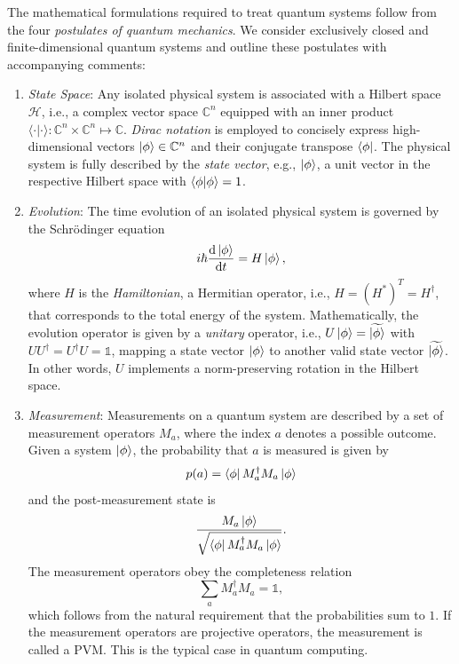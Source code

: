 \documentclass[../main.tex]{subfiles}
\begin{document}
The mathematical formulations required to treat quantum systems follow from the four \textit{postulates of quantum mechanics}. We consider exclusively closed and finite-dimensional quantum systems and outline these postulates with accompanying comments:
\begin{enumerate}[align=left]
        \item[Postulate 1] \textit{State Space}: Any isolated physical system is associated with a Hilbert space $\mathcal{H}$, i.e., a complex vector space $\mathbb{C}^n$ equipped with an inner product $\langle \cdot | \cdot \rangle : \mathbb{C}^n \times \mathbb{C}^n \mapsto \mathbb{C}$. \textit{Dirac notation} is employed to concisely express high-dimensional vectors $\ket{\phi} \in \mathbb{C}^n$ and their conjugate transpose $\bra{\phi}$. The physical system is fully described by the \textit{state vector}, e.g., $\ket{\phi}$, a unit vector in the respective Hilbert space with $\braket{\phi}{\phi} = 1$.
        
    \item[Postulate 2] \textit{Evolution}: The time evolution of an isolated physical system is           governed by the Schrödinger equation
        \begin{equation}
            i \hbar \frac{\dd \ket{\phi}}{\dd t} = H \ket{\phi},
        \end{equation} where $H$ is the \textit{Hamiltonian}, a Hermitian operator, i.e., $H = (H^{*})^T = H^\dagger$, that corresponds to the total energy of the system. Mathematically, the evolution operator is given by a \textit{unitary} operator, i.e., $U \ket{\phi} = \widetilde{\ket{\phi}}$ with $UU^\dagger = U^\dagger U = \mathds{1}$, mapping a state vector $\ket{\phi}$ to another valid state vector $\widetilde{\ket{\phi}}$. In other words, $U$ implements a norm-preserving rotation in the Hilbert space.
        
    \item[Postulate 3] \textit{Measurement}: Measurements on a quantum system are described by a set of measurement operators ${M_a }$, where the index $a$ denotes a possible outcome. Given a system $\ket{\phi}$, the probability that $a$ is measured is given by 
    \begin{equation}
        p(a) = \bra{\phi} M_a^\dagger  M_a \ket{\phi}
    \end{equation} and the post-measurement state is 
    \begin{equation}
        \frac{M_a \ket{\phi}}{\sqrt{\bra{\phi} M^\dagger_a M_a \ket{\phi} }}.
    \end{equation} The measurement operators obey the completeness relation
    \begin{equation}
        \sum_a M_a^\dagger M_a = \mathds{1},
    \end{equation} which follows from the natural requirement that the probabilities sum to $1$. If the measurement operators are projective operators, the measurement is called a \ac{PVM}. This is the typical case in quantum computing.
    

\end{enumerate}
\end{document}
